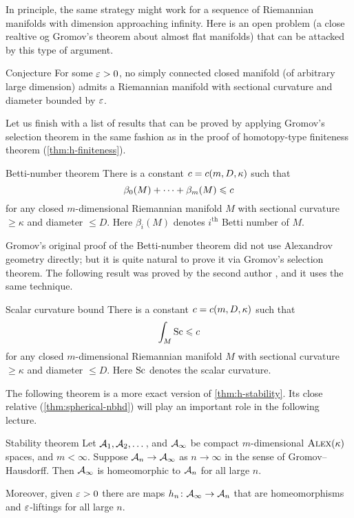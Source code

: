 In principle, the same strategy might work for a sequence of Riemannian manifolds with dimension approaching infinity.
Here is an open problem (a close realtive og Gromov's theorem about almost flat manifolds) that can be attacked by this type of argument.

\begin{thm}{Conjecture}
For some $\varepsilon>0$, no simply connected closed manifold (of arbitrary large dimension) admits a Riemannian manifold with sectional curvature and diameter bounded by $\varepsilon$.
\end{thm}

Let us finish with a list of results that can be proved by applying Gromov's selection theorem
in the same fashion as in the proof of homotopy-type finiteness theorem (\ref{thm:h-finiteness}).

\begin{thm}{Betti-number theorem}
There is a constant $c=c(m,D,\kappa)$ such that 
\[\beta_0(M)+\dots+\beta_m(M)\leqslant c\]
for any closed $m$-dimensional Riemannian manifold $M$ with sectional curvature $\ge \kappa$ and diameter $\le D$.
Here $\beta_i(M)$ denotes $i^\text{th}$ Betti number of $M$.
\end{thm}

Gromov's original proof \cite{gromov-1981} of the Betti-number theorem did not use Alexandrov geometry directly;
but it is quite natural to prove it via Gromov's selection theorem.
The following result was proved by the second author \cite{petrunin2008}, and it uses the same technique.

\begin{thm}{Scalar curvature bound}
There is a constant $c=c(m,D,\kappa)$ such that 
\[\int_M\mathrm{Sc}\leqslant c\]
for any closed $m$-dimensional Riemannian manifold $M$ with sectional curvature $\ge \kappa$ and diameter $\le D$.
Here $\mathrm{Sc}$ denotes the scalar curvature.
\end{thm}

The following theorem is a more exact version of \ref{thm:h-stability}.
Its close relative (\ref{thm:spherical-nbhd}) will play an important role in the following lecture.

\begin{thm}{Stability theorem}\label{thm:stability}
Let $\mathcal{A}_1,\mathcal{A}_2,\dots$, and $\mathcal{A}_\infty$ be compact $m$-dimensional $\textsc{Alex}(\kappa)$ spaces, and $m<\infty$.
Suppose $\mathcal{A}_n\to \mathcal{A}_\infty$ as $n\to \infty$ in the sense of Gromov--Hausdorff.
Then $\mathcal{A}_\infty$ is homeomorphic to $\mathcal{A}_n$ for all large $n$.

Moreover, given $\varepsilon>0$ there are maps $h_n\colon\mathcal{A}_\infty\to \mathcal{A}_n$ that are homeomorphisms and $\varepsilon$-liftings for all large $n$.
\end{thm}

